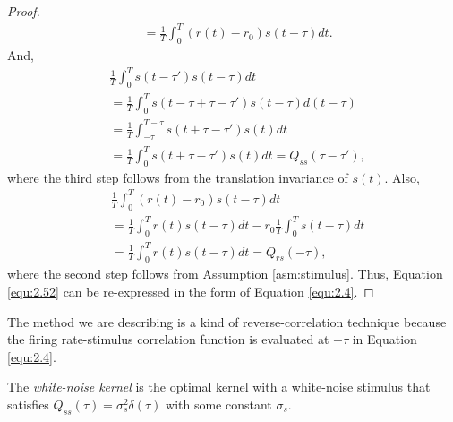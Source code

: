 \begin{proof}
\begin{equation}
\begin{aligned}
      &= \frac{1}{T}\int_0^{T}(r(t)-r_0)s(t-\tau)dt.
    \end{aligned}
  \end{equation}
  And,
  \begin{displaymath}
    \begin{aligned}
      &\frac{1}{T}\int_0^{T}s(t-\tau')s(t-\tau)dt\\
      &= \frac{1}{T}\int_0^{T}s(t-\tau+\tau-\tau')s(t-\tau)d(t-\tau)\\
      &= \frac{1}{T}\int_{-\tau}^{T-\tau}s(t+\tau-\tau')s(t)dt\\
      &= \frac{1}{T}\int_{0}^{T}s(t+\tau-\tau')s(t)dt = Q_{ss}(\tau-\tau'),
    \end{aligned}
  \end{displaymath}
  where the third step follows from the translation invariance of $s(t)$. Also,
  \begin{displaymath}
    \begin{aligned}
      &\frac{1}{T}\int_0^{T}(r(t)-r_0)s(t-\tau)dt\\
      &= \frac{1}{T}\int_0^{T}r(t)s(t-\tau)dt - r_0\frac{1}{T}\int_0^{T}s(t-\tau)dt\\
      &= \frac{1}{T}\int_0^{T}r(t)s(t-\tau)dt = Q_{rs}(-\tau),
    \end{aligned}
  \end{displaymath}
  where the second step follows from Assumption \ref{asm:stimulus}.
  Thus, Equation \ref{equ:2.52} can be re-expressed in the form of Equation \ref{equ:2.4}.
\end{proof}

\begin{rem}
  The method we are describing is a kind of reverse-correlation technique because the firing rate-stimulus correlation function is evaluated at $-\tau$ in Equation \ref{equ:2.4}.
\end{rem}

\begin{defn}
  \label{def:WhiteNoiseKernel}
  The \emph{white-noise kernel} is the optimal kernel with a white-noise stimulus that satisfies $Q_{ss}(\tau) = \sigma_s^2\delta(\tau)$ with some constant $\sigma_s$.
\end{defn}

